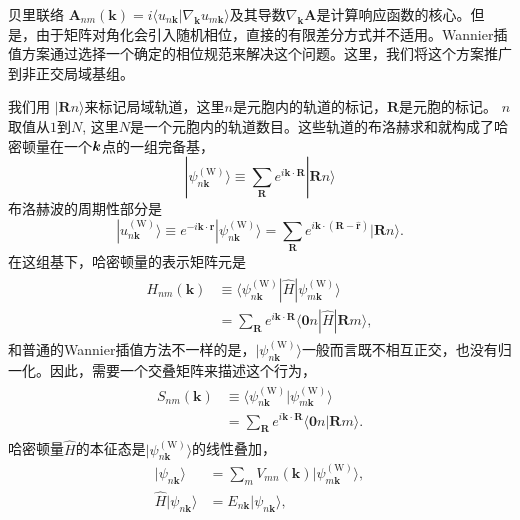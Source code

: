 贝里联络\cite{berry_quantal_1984} $\boldsymbol{A}_{nm}(\boldsymbol{k})=i\langle u_{n\boldsymbol{k}}|\nabla_{\boldsymbol{k}}u_{m\boldsymbol{k}}\rangle$及其导数$\nabla_{\boldsymbol{k}}\boldsymbol{A}$是计算响应函数的核心。但是，由于矩阵对角化会引入随机相位，直接的有限差分方式并不适用。Wannier插值方案通过选择一个确定的相位规范来解决这个问题。这里，我们将这个方案推广到非正交局域基组。

我们用 $|\boldsymbol{R}n\rangle$来标记局域轨道，这里$n$是元胞内的轨道的标记，$\boldsymbol{R}$是元胞的标记。 $n$取值从$1$到$N$, 这里$N$是一个元胞内的轨道数目。这些轨道的布洛赫求和就构成了哈密顿量在一个$\boldsymbol{k}$点的一组完备基，
\[
|\psi_{n\boldsymbol{k}}^{(\text{W})}\rangle\equiv\sum_{\boldsymbol{R}}e^{i\boldsymbol{k}\cdot\boldsymbol{R}}|\boldsymbol{R}n\rangle
\]
布洛赫波的周期性部分是 
\[
|u_{n\boldsymbol{k}}^{(\text{W})}\rangle\equiv e^{-i\boldsymbol{k}\cdot\hat{\boldsymbol{r}}}|\psi_{n\boldsymbol{k}}^{(\text{W})}\rangle=\sum_{\boldsymbol{R}}e^{i\boldsymbol{k}\cdot(\boldsymbol{R}-\hat{\boldsymbol{r}})}|\boldsymbol{R}n\rangle.
\]
在这组基下，哈密顿量的表示矩阵元是
\begin{align}
\begin{split}
H_{nm}(\boldsymbol{k}) & \equiv\langle\psi_{n\boldsymbol{k}}^{(\text{W})}|\hat{H}|\psi_{m\boldsymbol{k}}^{(\text{W})}\rangle\\
& =\sum_{\boldsymbol{R}}e^{i\boldsymbol{k}\cdot\boldsymbol{R}}\langle\boldsymbol{0}n|\hat{H}|\boldsymbol{R}m\rangle,
\end{split}
\end{align}
和普通的Wannier插值方法不一样的是，$|\psi_{n\boldsymbol{k}}^{(\text{W})}\rangle$一般而言既不相互正交，也没有归一化。因此，需要一个交叠矩阵来描述这个行为，
\begin{align}
\begin{split}
S_{nm}(\boldsymbol{k}) & \equiv\langle\psi_{n\boldsymbol{k}}^{(\text{W})}|\psi_{m\boldsymbol{k}}^{(\text{W})}\rangle\\
& =\sum_{\boldsymbol{R}}e^{i\boldsymbol{k}\cdot\boldsymbol{R}}\langle\boldsymbol{0}n|\boldsymbol{R}m\rangle.\label{S}
\end{split}
\end{align}
哈密顿量$\hat{H}$的本征态是$|\psi_{n\boldsymbol{k}}^{(\text{W})}\rangle$的线性叠加，
\begin{align}
|\psi_{n\boldsymbol{k}}\rangle & =\sum_{m}V_{mn}(\boldsymbol{k})|\psi_{m\boldsymbol{k}}^{(\text{W})}\rangle,\\
\hat{H}|\psi_{n\boldsymbol{k}}\rangle & =E_{n\boldsymbol{k}}|\psi_{n\boldsymbol{k}}\rangle,
\end{align}
